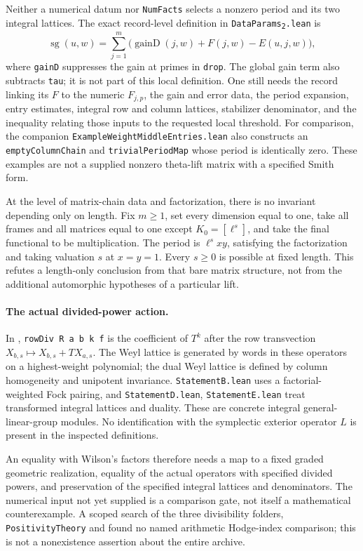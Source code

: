 \documentclass[11pt,a4paper]{article}
\theoremstyle{remark}
\begin{document}
Neither a numerical datum nor \texttt{NumFacts} selects a nonzero period
and its two integral lattices.  The exact record-level definition in
\texttt{DataParams\textsubscript{2}.lean} is
\[
 \operatorname{sg}(u,w)=\sum_{j=1}^m
   \bigl(\operatorname{gainD}(j,w)+F(j,w)-E(u,j,w)\bigr),
\]
where \texttt{gainD} suppresses the gain at primes in \texttt{drop}.
The global gain term also subtracts \texttt{tau}; it is not part of this
local definition.  One still needs the record linking its $F$ to the
numeric $F_{j,p}$, the gain and error data, the period expansion, entry
estimates, integral row and column lattices, stabilizer denominator, and
the inequality relating those inputs to the requested local threshold.
For comparison, the companion \texttt{ExampleWeightMiddleEntries.lean}
also constructs an \texttt{emptyColumnChain} and
\texttt{trivialPeriodMap} whose period is identically zero.  These examples
are not a supplied nonzero theta-lift matrix with a specified Smith form.

At the level of matrix-chain data and factorization, there is no invariant
depending only on length.  Fix $m\ge1$, set every dimension equal to one,
take all frames and all matrices equal to one except $K_0=[\ell^s]$, and
take the final functional to be multiplication.  The period is
$\ell^sxy$, satisfying the factorization and taking valuation $s$ at
$x=y=1$.  Every $s\ge0$ is possible at fixed length.  This refutes a
length-only conclusion from that bare matrix structure, not from the
additional automorphic hypotheses of a particular lift.

\paragraph{The actual divided-power action.}
In ,
\texttt{rowDiv R a b k f} is the coefficient of $T^k$ after the row
transvection $X_{b,s}\mapsto X_{b,s}+TX_{a,s}$.  The Weyl lattice is
generated by words in these operators on a highest-weight polynomial;
the dual Weyl lattice is defined by column homogeneity and unipotent
invariance.  \texttt{StatementB.lean} uses a factorial-weighted Fock
pairing, and \texttt{StatementD.lean}, \texttt{StatementE.lean}
treat transformed integral lattices and duality.  These are concrete
integral general-linear-group modules.  No identification with the
symplectic exterior operator $L$ is present in the inspected definitions.

An equality with Wilson's factors therefore needs a map to a fixed graded
geometric realization, equality of the actual operators with specified
divided powers, and preservation of the specified integral lattices and
denominators.  The numerical input not yet supplied is a comparison gate,
not itself a mathematical counterexample.  A scoped search of the three
divisibility folders, \texttt{PositivityTheory} and
 found no named arithmetic Hodge-index
comparison; this is not a nonexistence assertion about the entire archive.
\end{document}
